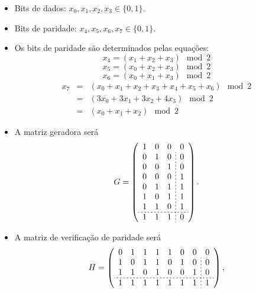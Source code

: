 \begin{frame}[allowframebreaks]
  \begin{itemize}
    \item Bits de dados: $x_0, x_1, x_2, x_3 \in \{0,1\}$.
    \item Bits de paridade: $x_4, x_5, x_6, x_7 \in \{0,1\}$.
    \item Os bits de paridade são determinados pelas equações:
        \begin{equation}
        x_4 = (x_1 + x_2 + x_3) \mod 2
        \end{equation}
        \begin{equation}
        x_5 = (x_0 + x_2 + x_3) \mod 2
        \end{equation}
        \begin{equation}
        x_6 = (x_0 + x_1 + x_3) \mod 2
        \end{equation}
	\begin{eqnarray}
	x_7 &=& (x_0 + x_1 + x_2 + x_3 + x_4 + x_5 + x_6) \mod 2 \\
	    &=& (3 x_0 + 3 x_1 + 3 x_2 + 4 x_3 ) \mod 2 \\
	    &=& (x_0 + x_1 + x_2) \mod 2
	\end{eqnarray}	
    \item A matriz geradora será
        \begin{equation}
        G = 
	\left(
        \begin{array}{ccc;{2pt/2pt}c}
        1 & 0 & 0 & 0 \\
        0 & 1 & 0 & 0 \\
        0 & 0 & 1 & 0 \\
        0 & 0 & 0 & 1 \\
        0 & 1 & 1 & 1 \\
        1 & 0 & 1 & 1 \\
        1 & 1 & 0 & 1 \\ \hdashline[2pt/2pt]
	1 & 1 & 1 & 0
	\end{array}
	\right).
        \end{equation}

    \item A matriz de verificação de paridade será
        \begin{equation}\label{eq-Hmat844}
        H = 
        \left(
        \begin{array}{ccccccc;{2pt/2pt}c}
        0 & 1 & 1 & 1 & 1 & 0 & 0 & 0 \\
        1 & 0 & 1 & 1 & 0 & 1 & 0 & 0 \\
        1 & 1 & 0 & 1 & 0 & 0 & 1 & 0 \\ \hdashline[2pt/2pt]
        1 & 1 & 1 & 1 & 1 & 1 & 1 & 1
        \end{array}
        \right),
        \end{equation} 


\end{itemize}
\end{frame}
